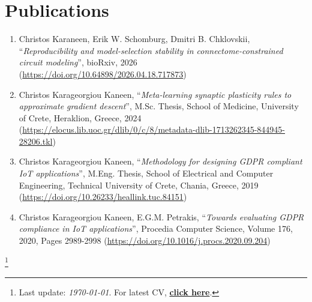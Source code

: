 \documentclass[letterpaper,11pt]{article}
\newcommand\blfootnote[1]{%
  \begingroup
  \renewcommand\thefootnote{}\footnote{#1}%
  \addtocounter{footnote}{-1}%
  \endgroup
}
\begin{document}
\section{Publications}
\begin{enumerate}
\item \label{KaraneenEtAl2026Marker} Christos Karaneen, Erik W. Schomburg, Dmitri B. Chklovskii, ``\textit{Reproducibility and model-selection stability in connectome-constrained circuit modeling}'', bioRxiv, 2026 (\url{https://doi.org/10.64898/2026.04.18.717873})
\item \label{NeuroscienceMScThesisMarker} Christos Karageorgiou Kaneen, ``\textit{Meta-learning synaptic plasticity rules to approximate gradient descent}'', M.Sc. Thesis, School of Medicine, University of Crete, Heraklion, Greece, 2024 (\url{https://elocus.lib.uoc.gr/dlib/0/c/8/metadata-dlib-1713262345-844945-28206.tkl})
\item Christos Karageorgiou Kaneen, ``\textit{Methodology for designing GDPR compliant IoT applications}'', M.Eng. Thesis, School of Electrical and Computer Engineering, Technical University of Crete, Chania, Greece, 2019 (\url{https://doi.org/10.26233/heallink.tuc.84151})
\item Christos Karageorgiou Kaneen, E.G.M. Petrakis, ``\textit{Towards evaluating GDPR compliance in IoT applications}'', Procedia Computer Science, Volume 176, 2020, Pages 2989-2998 (\url{https://doi.org/10.1016/j.procs.2020.09.204})
\end{enumerate}

\blfootnote{\large{Last update: \textit{\today}. For latest CV, \href{https://raw.githubusercontent.com/ckaraneen/cv/master/cv.pdf}{\textbf{click here}}.}}
\end{document}
